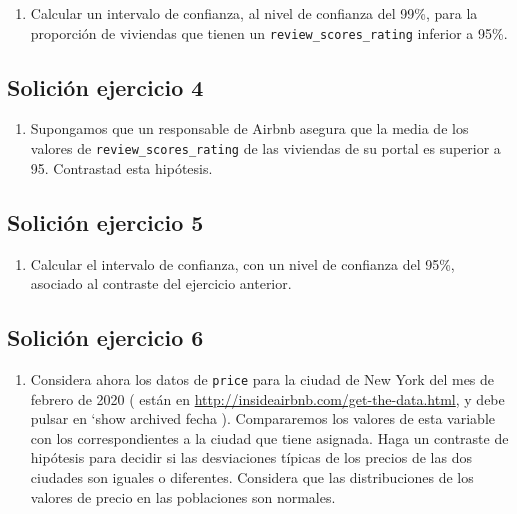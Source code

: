 \documentclass[
]{article}
\providecommand{\tightlist}{%
  \setlength{\itemsep}{0pt}\setlength{\parskip}{0pt}}
\begin{document}
\begin{enumerate}
\def\labelenumi{\arabic{enumi}.}
\setcounter{enumi}{2}
\tightlist
\item
  Calcular un intervalo de confianza, al nivel de confianza del 99\%,
  para la proporción de viviendas que tienen un
  \texttt{review\_scores\_rating} inferior a 95\%.
\end{enumerate}

\hypertarget{soliciuxf3n-ejercicio-4}{%
\subsection{Solición ejercicio 4}\label{soliciuxf3n-ejercicio-4}}

\begin{enumerate}
\def\labelenumi{\arabic{enumi}.}
\setcounter{enumi}{3}
\tightlist
\item
  Supongamos que un responsable de Airbnb asegura que la media de los
  valores de \texttt{review\_scores\_rating} de las viviendas de su
  portal es superior a 95. Contrastad esta hipótesis.
\end{enumerate}

\hypertarget{soliciuxf3n-ejercicio-5}{%
\subsection{Solición ejercicio 5}\label{soliciuxf3n-ejercicio-5}}

\begin{enumerate}
\def\labelenumi{\arabic{enumi}.}
\setcounter{enumi}{4}
\tightlist
\item
  Calcular el intervalo de confianza, con un nivel de confianza del
  95\%, asociado al contraste del ejercicio anterior.
\end{enumerate}

\hypertarget{soliciuxf3n-ejercicio-6}{%
\subsection{Solición ejercicio 6}\label{soliciuxf3n-ejercicio-6}}

\begin{enumerate}
\def\labelenumi{\arabic{enumi}.}
\setcounter{enumi}{5}
\tightlist
\item
  Considera ahora los datos de \texttt{price} para la ciudad de New York
  del mes de febrero de 2020 ( están en
  \url{http://insideairbnb.com/get-the-data.html}, y debe pulsar en
  `show archived fecha ). Compararemos los valores de esta variable con
  los correspondientes a la ciudad que tiene asignada. Haga un contraste
  de hipótesis para decidir si las desviaciones típicas de los precios
  de las dos ciudades son iguales o diferentes. Considera que las
  distribuciones de los valores de precio en las poblaciones son
  normales.
\end{enumerate}
\end{document}
